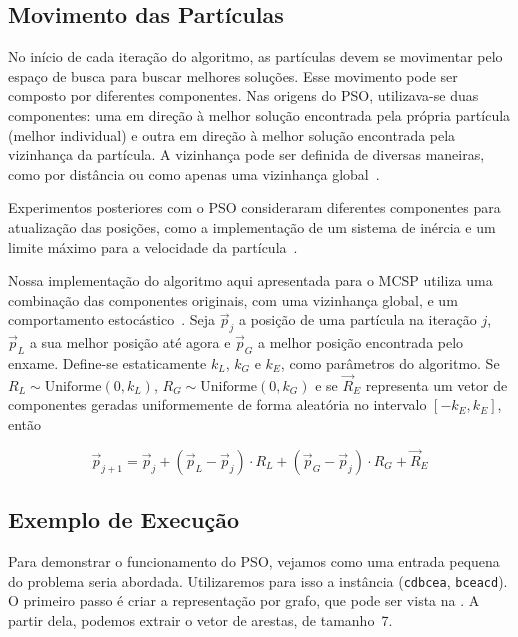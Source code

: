 \subsection{Movimento das Partículas} \label{sec:movimento}

    No início de cada iteração do algoritmo, as partículas devem se movimentar pelo espaço de busca para buscar melhores soluções. Esse movimento pode ser composto por diferentes componentes. Nas origens do PSO, utilizava-se duas componentes: uma em direção à melhor solução encontrada pela própria partícula (melhor individual) e outra em direção à melhor solução encontrada pela vizinhança da partícula. A vizinhança pode ser definida de diversas maneiras, como por distância ou como apenas uma vizinhança global~\cite{bratton_defining_2007}.

    Experimentos posteriores com o PSO consideraram diferentes componentes para atualização das posições, como a implementação de um sistema de inércia e um limite máximo para a velocidade da partícula~\cite{shi_parameter_1998}.

    Nossa implementação do algoritmo aqui apresentada para o MCSP utiliza uma combinação das componentes originais, com uma vizinhança global, e um comportamento estocástico~\cite[p.~642]{marti_handbook_2018}. Seja $\vec{p}_j$ a posição de uma partícula na iteração $j$, $\vec{p}_L$ a sua melhor posição até agora e $\vec{p}_G$ a melhor posição encontrada pelo enxame. Define-se estaticamente $k_L$, $k_G$ e $k_E$, como parâmetros do algoritmo. Se $R_L \sim \text{Uniforme}(0, k_L)$, $R_G \sim \text{Uniforme}(0, k_G)$ e se $\vec{R}_E$ representa um vetor de componentes geradas uniformemente de forma aleatória no intervalo $[-k_E, k_E]$, então

    \[
        \vec{p}_{j+1} = \vec{p}_j + \left(\vec{p}_L - \vec{p}_j\right) \cdot R_L + \left(\vec{p}_G - \vec{p}_j\right) \cdot R_G + \vec{R}_E
    \]

\subsection{Exemplo de Execução}

    Para demonstrar o funcionamento do PSO, vejamos como uma entrada pequena do problema seria abordada. Utilizaremos para isso a instância (\texttt{cdbcea}, \texttt{bceacd}). O primeiro passo é criar a representação por grafo, que pode ser vista na . A partir dela, podemos extrair o vetor de arestas, de tamanho~7.

